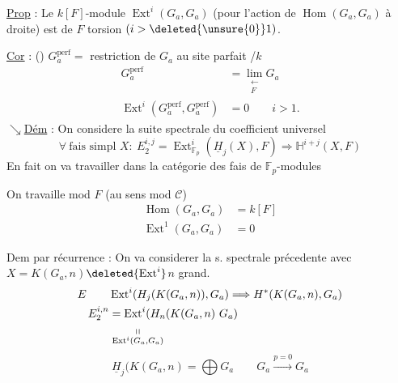
\uline{Prop} : Le $k[F]$-module $\operatorname{Ext}^i(G_a,G_a)$ (pour l'action de $\operatorname{Hom}(G_a,G_a)$ à droite) est de $F$ torsion $(i>\deleted{\unsure{0}}1)$.

\uline{Cor} : () $G_a^\mathrm{perf}=$ restriction de $G_a$ au site parfait /$k$
\[
\begin{aligned}
G_a^\mathrm{perf}&=\lim_{\substack{\longleftarrow\\ F}}G_a\\
\operatorname{Ext}^i(G_a^\mathrm{perf},G_a^\mathrm{perf})&=0\qquad i>1.
\end{aligned}
\]
$\searrow$\quad\uline{Dém} : On considere la suite spectrale du coefficient universel
\[
\forall\ \text{fais simpl }X:\ E_2^{i,j}=\operatorname{Ext}^i_{\mathbb F_p}(\underline H_j(X),F)\Longrightarrow \mathbb H^{i+j}(X,F)
\]
En fait on va travailler dans la catégorie des fais de $\mathbb F_p$-modules

On travaille mod $F$ (au sens mod $\mathcal C$)
\[
\begin{aligned}
\operatorname{Hom}(G_a,G_a)&=k[F]\\
\operatorname{Ext}^1(G_a,G_a)&=0
\end{aligned}
\]

Dem par récurrence : On va considerer la s. spectrale précedente avec $X=K(G_a,n)$\qquad $\deleted{\operatorname{Ext}^i}$\quad $n$ grand.
\[
\begin{aligned}
E\qquad&\operatorname{Ext}^i(H_j(K(G_a,n)),G_a)\Longrightarrow H^*(K(G_a,n),G_a)\\
E_2^{i,n}&=\operatorname{Ext}^i(H_n(K(G_a,n)\ G_a)\\
&\underset{\operatorname{Ext}^i(G_a,G_a)}{\shortparallel}
\end{aligned}
\]
\[
\underline H_j(K(G_a,n)=\bigoplus G_a\qquad G_a\xrightarrow{p=0}G_a
\]
